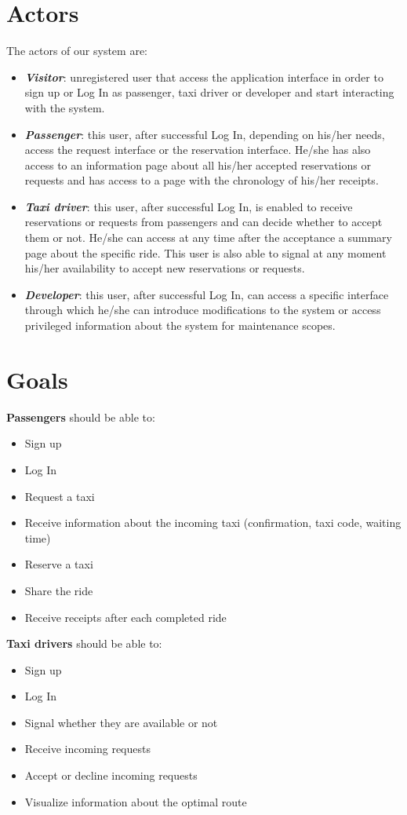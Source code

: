 \section{Actors}
The actors of our system are:
\begin{itemize}
	\item \textbf{\textit{Visitor}}: unregistered user that access the application interface in order to sign up or Log In as passenger, taxi driver or developer and start interacting with the system.
	\item \textbf{\textit{Passenger}}: this user, after successful Log In, depending on his/her needs, access the request interface or the reservation interface. He/she has also access to an information page about all his/her accepted reservations or requests and has access to a page with the chronology of his/her receipts.
	\item \textbf{\textit{Taxi driver}}: this user, after successful Log In, is enabled to receive reservations or requests from passengers and can decide whether to accept them or not. He/she can access at any time after the acceptance a summary page about the specific ride. This user is also able to signal at any moment his/her availability to accept new reservations or requests.
	\item \textbf{\textit{Developer}}: this user, after successful Log In, can access a specific interface through which he/she can introduce modifications to the system or access privileged information about the system for maintenance scopes.
\end{itemize}

\section{Goals}
\noindent \textbf{Passengers} should be able to:
\begin{itemize}
	\item Sign up
	\item Log In
	\item Request a taxi
	\item Receive information about the incoming taxi (confirmation, taxi code, waiting time)
	\item Reserve a taxi
	\item Share the ride
	\item Receive receipts after each completed ride
\end{itemize}

\noindent \textbf{Taxi drivers} should be able to:
\begin{itemize}
	\item Sign up
	\item Log In
	\item Signal whether they are available or not
	\item Receive incoming requests
	\item Accept or decline incoming requests
	\item Visualize information about the optimal route
\end{itemize}

